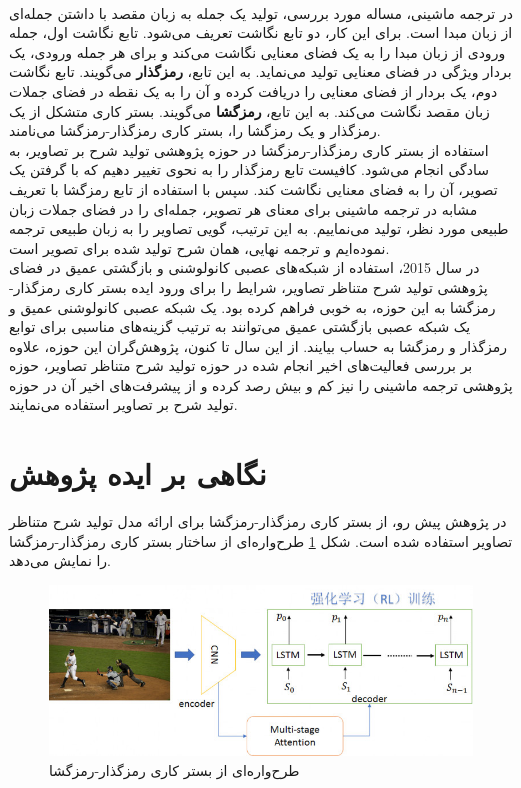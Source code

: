 \begin{itemize}
\\
در ترجمه ماشینی، مساله مورد بررسی، تولید یک جمله به زبان مقصد با داشتن جمله‌ای از زبان مبدا است. برای این کار، دو تابع نگاشت تعریف می‌شود. تابع نگاشت اول، جمله ورودی از زبان مبدا را به یک فضای معنایی نگاشت می‌کند و برای هر جمله ورودی، یک بردار ویژگی در فضای معنایی تولید می‌نماید. به این تابع، \textbf{رمزگذار}‌ می‌گویند. تابع نگاشت دوم، یک بردار از فضای معنایی را دریافت کرده و آن را به یک نقطه در فضای جملات زبان مقصد نگاشت می‌کند. به این تابع، \textbf{رمزگشا} می‌گویند. بستر کاری متشکل از یک رمزگذار و یک رمزگشا را، بستر کاری رمزگذار-رمزگشا می‌نامند. 
\\
استفاده از بستر کاری رمزگذار-رمزگشا در حوزه پژوهشی تولید شرح بر تصاویر، به سادگی انجام می‌شود. کافیست تابع رمزگذار را به نحوی تغییر دهیم که با گرفتن یک تصویر، آن را به فضای معنایی نگاشت کند. سپس با استفاده از تابع رمزگشا با تعریف مشابه در ترجمه ماشینی برای معنای هر تصویر، جمله‌ای را در فضای جملات زبان طبیعی مورد نظر، تولید می‌نماییم. به این ترتیب، گویی تصاویر را به زبان طبیعی ترجمه نموده‌ایم و ترجمه نهایی، همان شرح تولید شده برای تصویر است.
\\
در سال 2015، استفاده از شبکه‌های عصبی کانولوشنی و بازگشتی عمیق در فضای پژوهشی تولید شرح متناظر تصاویر، شرایط را برای ورود ایده بستر کاری رمزگذار-رمزگشا به این حوزه، به خوبی فراهم کرده بود. یک شبکه عصبی کانولوشنی عمیق و یک شبکه عصبی بازگشتی عمیق می‌توانند به ترتیب گزینه‌های مناسبی برای توابع رمزگذار و رمزگشا به حساب بیایند. از این سال تا کنون، پژوهش‌گران این حوزه، علاوه بر بررسی فعالیت‌های اخیر انجام شده در حوزه تولید شرح متناظر تصاویر، حوزه پژوهشی ترجمه ماشینی را نیز کم و بیش رصد کرده و از پیشرفت‌های اخیر آن در حوزه تولید شرح بر تصاویر استفاده می‌نمایند.
	
\end{itemize}

\section{نگاهی بر ایده پژوهش}
در پژوهش پیش رو، از بستر کاری رمزگذار-رمزگشا برای ارائه مدل تولید شرح متناظر تصاویر استفاده شده است. شکل \ref{fig:mdl} طرح‌واره‌ای از ساختار بستر کاری رمزگذار-رمزگشا را نمایش می‌دهد. 

\begin{figure}[h]
	\centering
	\includegraphics[scale=0.5]{Imgs/mdl.jpg}
	\caption{طرح‌واره‌ای از بستر کاری رمزگذار-رمزگشا}
	\label{fig:mdl}
\end{figure}

